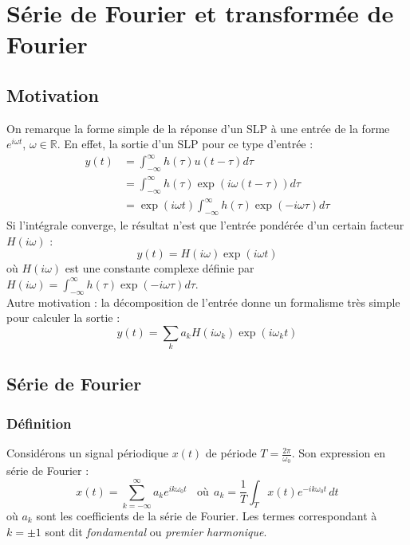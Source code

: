 \chapter{Série de Fourier et transformée de Fourier}

\section{Motivation}
On remarque la forme simple de la réponse d'un SLP à  une entrée de
la forme $e^{i\omega t}$, $\omega\in\mathbb{R}$. En effet, la sortie d'un SLP pour ce type
d'entrée :
\begin{equation}
	\begin{array}{ll}
		y(t) & = \int_{-\infty}^\infty h(\tau)u(t-\tau)d\tau                    \\
		     & = \int_{-\infty}^\infty h(\tau)\exp(i\omega(t-\tau))d\tau        \\
		     & = \exp(i\omega t)\int_{-\infty}^\infty h(\tau)\exp(-i\omega\tau) 
		d\tau
	\end{array}
\end{equation}
Si l'intégrale converge, le résultat n'est que l'entrée pondérée 
d'un certain facteur $H(i\omega)$ :
\begin{equation}
	y(t) = H(i\omega)\exp(i\omega t)
\end{equation}
où $H(i\omega)$ est une constante complexe définie par $H(i\omega) =
\int_{-\infty}^\infty h(\tau)\exp(-i\omega\tau)d\tau$.\\
Autre motivation : la décomposition de l'entrée donne un formalisme
très simple pour calculer la sortie :
\begin{equation}
	y(t) = \sum_k a_kH(i\omega_k)\exp(i\omega_kt)
\end{equation}

\section{Série de Fourier}
\subsection{Définition}
Considérons un signal périodique $x(t)$ de période $T=\frac{2\pi}
{\omega_0}$. Son expression en série de Fourier :
\begin{equation}
	x(t) = \sum_{k=-\infty}^\infty a_ke^{ik\omega_0t}\ \ \ \ \text{où}\ \ 
	a_k = \frac{1}{T}\int_Tx(t)e^{-ik\omega_0t}\, dt
\end{equation}
où $a_k$ sont les coefficients de la série de Fourier. Les termes
correspondant à $k=\pm 1$ sont dit \textit{fondamental} ou \textit{
	premier harmonique}.\ \\
	
